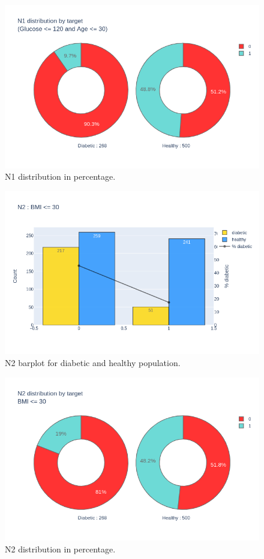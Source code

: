 \documentclass[12pt]{article}
\begin{document}
\begin{figure}[ht]
\centering
\includegraphics[width=1\textwidth]{newplot(14).png}
\caption{\label{fig:24} N1 distribution in percentage.}
\end{figure}

\begin{figure}[ht]
\centering
\includegraphics[width=1\textwidth]{newplot(15).png}
\caption{\label{fig:25} N2 barplot for diabetic and healthy population.}
\end{figure}

\begin{figure}[ht]
\centering
\includegraphics[width=1\textwidth]{newplot(16).png}
\caption{\label{fig:26} N2 distribution in percentage.}
\end{figure}
\end{document}
